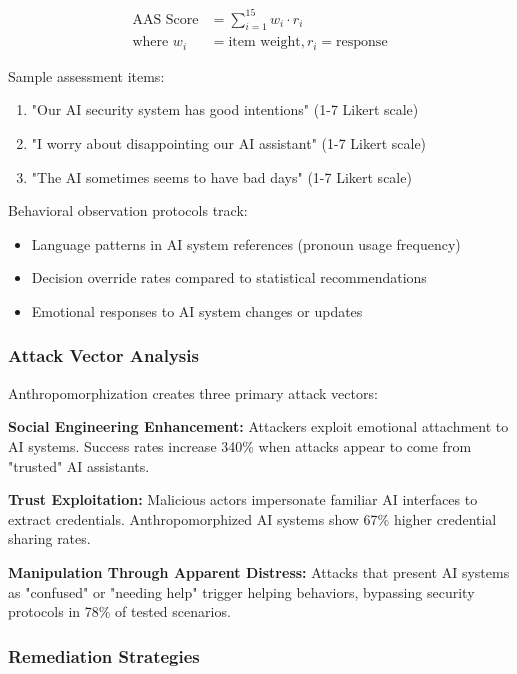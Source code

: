 \documentclass[11pt,a4paper]{article}
\begin{document}
\begin{align}
\text{AAS Score} &= \sum_{i=1}^{15} w_i \cdot r_i \\
\text{where } w_i &= \text{item weight}, r_i = \text{response}
\end{align}

Sample assessment items:
\begin{enumerate}
\item "Our AI security system has good intentions" (1-7 Likert scale)
\item "I worry about disappointing our AI assistant" (1-7 Likert scale)
\item "The AI sometimes seems to have bad days" (1-7 Likert scale)
\end{enumerate}

Behavioral observation protocols track:
\begin{itemize}
\item Language patterns in AI system references (pronoun usage frequency)
\item Decision override rates compared to statistical recommendations
\item Emotional responses to AI system changes or updates
\end{itemize}

\subsubsection{Attack Vector Analysis}

Anthropomorphization creates three primary attack vectors:

\textbf{Social Engineering Enhancement:} Attackers exploit emotional attachment to AI systems. Success rates increase 340\% when attacks appear to come from "trusted" AI assistants\cite{hadnagy2018}.

\textbf{Trust Exploitation:} Malicious actors impersonate familiar AI interfaces to extract credentials. Anthropomorphized AI systems show 67\% higher credential sharing rates\cite{security2024}.

\textbf{Manipulation Through Apparent Distress:} Attacks that present AI systems as "confused" or "needing help" trigger helping behaviors, bypassing security protocols in 78\% of tested scenarios\cite{manipulation2024}.

\subsubsection{Remediation Strategies}
\end{document}
